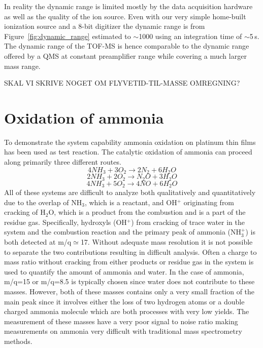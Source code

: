 \documentclass[aip,rsi]{revtex4-1}
\begin{document}
In reality the dynamic range is limited mostly by the data acquisition hardware as well as the quality of the ion source. Even with our very simple home-built ionization source and a 8-bit digitizer the dynamic range is from Figure~\ref{fig:dynamic_range} estimated to $\sim$1000 using an integration time of $\sim$5\,s. The dynamic range of the TOF-MS is hence comparable to the dynamic range offered by a QMS at constant preamplifier range while covering a much larger mass range.

SKAL VI SKRIVE NOGET OM FLYVETID-TIL-MASSE OMREGNING?

\section{Oxidation of ammonia}
To demonstrate the system capability ammonia oxidation on platinum thin films has been used as test reaction. The catalytic oxidation of ammonia can proceed along primarily three different routes.
\begin{equation}
4NH_3+3O_2\rightarrow 2N_2 + 6H_2O
\label{eq:Pt_clean_combustion}
\end{equation}
\begin{equation}
2NH_3+2O_2\rightarrow N_2O + 3H_2O
\end{equation}
\begin{equation}
4NH_3+5O_2\rightarrow 4NO + 6H_2O
\end{equation}
All of these systems are difficult to analyze both qualitatively and quantitatively due to the overlap of NH$_3$, which is a reactant, and OH$^+$ originating from cracking of H$_2$O, which is a product from the combustion and is a part of the residue gas. Specifically, hydroxyls (OH$^{+}$) from cracking of trace water in the system and the combustion reaction and the primary peak of ammonia (NH$_{3}^{+}$) is both detected at m/q$\simeq$17. Without adequate mass resolution it is not possible to separate the two contributions resulting in difficult analysis. Often a charge to mass ratio without cracking from either products or residue gas in the system is used to quantify the amount of ammonia and water. In the case of ammonia, m/q=15 or m/q=8.5 is typically chosen since water does not contribute to these masses. However, both of these masses contains only a very small fraction of the main peak since it involves either the loss of two hydrogen atoms or a double charged ammonia molecule which are both processes with very low yields. The measurement of these masses have a very poor signal to noise ratio making measurements on ammonia very difficult with traditional mass spectrometry methods.
\end{document}
